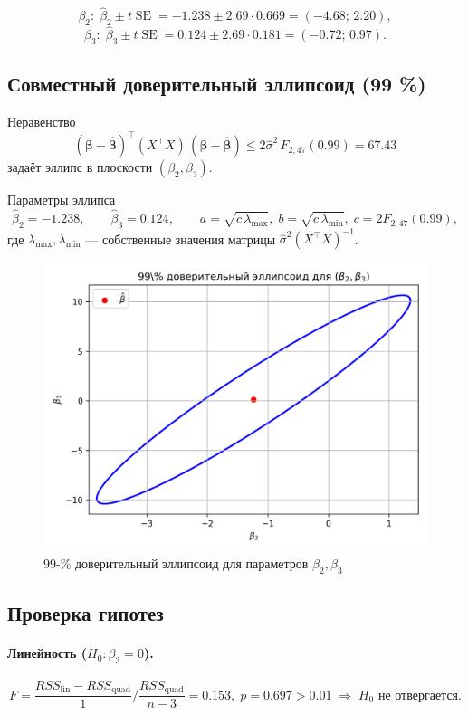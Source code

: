 \documentclass[areasetadvanced]{scrartcl}
\begin{document}
\[
\beta_2:\;
\hat\beta_2\pm t\operatorname{SE}
 =-1.238\pm2.69\cdot0.669
 =\boxed{(-4.68;\,2.20)},
\]
\[
\beta_3:\;
\hat\beta_3\pm t\operatorname{SE}
 =0.124\pm2.69\cdot0.181
 =\boxed{(-0.72;\,0.97)}.
\]

\subsection{Совместный доверительный эллипсоид (99 \%)}

Неравенство
\[
(\boldsymbol\beta-\hat{\boldsymbol\beta})^{\!\top}
(X^\top X)\,(\boldsymbol\beta-\hat{\boldsymbol\beta})
\le 2\hat\sigma^{2}\,F_{2,47}(0.99)=\boxed{67.43}
\]
задаёт эллипс в плоскости $(\beta_2,\beta_3)$.

Параметры эллипса  
\[
\hat\beta_2=-1.238,\qquad
\hat\beta_3= 0.124,\qquad
a=\sqrt{c\,\lambda_{\max}},\;
b=\sqrt{c\,\lambda_{\min}},\;
c=2F_{2,47}(0.99),
\]
где $\lambda_{\max},\lambda_{\min}$ — собственные значения матрицы
$\hat\sigma^{2}(X^\top X)^{-1}$.

\begin{figure}[H]
  \centering
  \includegraphics[width=.55\textwidth]{figs/task1_conf_ellipse.png}
  \caption{99-\% доверительный эллипсоид для параметров $\beta_2,\beta_3$}
\end{figure}


\subsection{Проверка гипотез}
\paragraph{Линейность ($H_0:\beta_3=0$).}
\[
F=\frac{RSS_{\text{lin}}-RSS_{\text{quad}}}{1}\Big/
  \frac{RSS_{\text{quad}}}{n-3}
  =0.153,\; p=0.697>0.01\;\Rightarrow\;H_0\text{ не отвергается.}
\]
\end{document}

